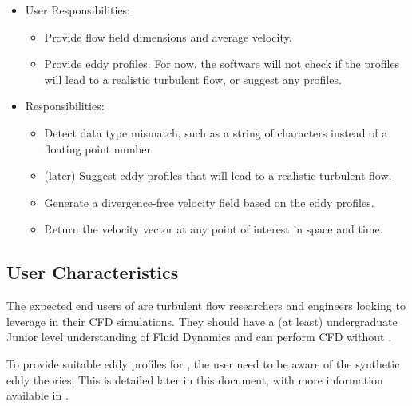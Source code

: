 \documentclass[12pt]{article}
\begin{document}
\begin{itemize}
\item User Responsibilities:
\begin{itemize}
\item Provide flow field dimensions and average velocity.
\item Provide eddy profiles. For now, the software will not check if the profiles will lead to a realistic turbulent flow, or suggest any profiles.
\end{itemize}
\item \progname{} Responsibilities:
\begin{itemize}
\item Detect data type mismatch, such as a string of characters instead of a
  floating point number
\item (later) Suggest eddy profiles that will lead to a realistic turbulent flow.
\item Generate a divergence-free velocity field based on the eddy profiles.
\item Return the velocity vector at any point of interest in space and time.
\end{itemize}
\end{itemize}


\subsection{User Characteristics} \label{SecUserCharacteristics}

The expected end users of \progname{} are turbulent flow researchers and engineers looking to leverage \progname{} in their CFD simulations. They should have a (at least) undergraduate Junior level understanding of Fluid Dynamics and can perform CFD without \progname{}.

To provide suitable eddy profiles for \progname{}, the user need to be aware of the synthetic eddy theories. This is detailed later in this document, with more information available in \citet{PolettoEtAl2013}.
\end{document}
